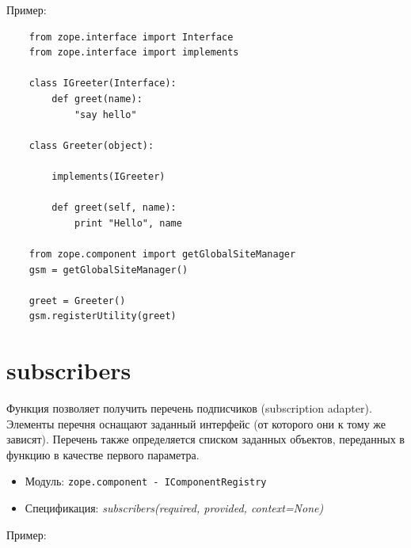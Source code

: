 \documentclass[a4paper,openany,twoside,draft]{book}
\providecommand*{\DUroletitlereference}[1]{\textsl{#1}}
\begin{document}
Пример:

\begin{verbatim}
    from zope.interface import Interface
    from zope.interface import implements

    class IGreeter(Interface):
        def greet(name):
            "say hello"

    class Greeter(object):

        implements(IGreeter)

        def greet(self, name):
            print "Hello", name

    from zope.component import getGlobalSiteManager
    gsm = getGlobalSiteManager()

    greet = Greeter()
    gsm.registerUtility(greet)
\end{verbatim}


\section*{subscribers%
  \label{subscribers}%
}

Функция позволяет получить перечень подписчиков (subscription adapter).  Элементы перечня оснащают заданный интерфейс (от которого они к тому же зависят).  Перечень также определяется списком заданных объектов, переданных в функцию в качестве первого параметра.

\begin{itemize}

\item Модуль: \texttt{zope.component - IComponentRegistry}

\item Спецификация: \DUroletitlereference{subscribers(required, provided, context=None)}

\end{itemize}

Пример:
\end{document}
